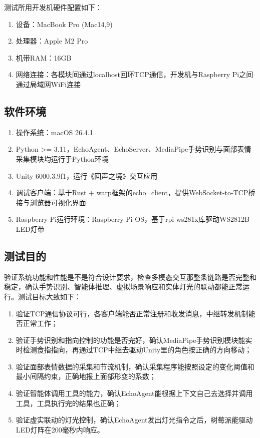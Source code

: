 \documentclass[bachelor]{njupthesis}
\begin{document}
测试所用开发机硬件配置如下：

\begin{enumerate}
\item 设备：MacBook Pro (Mac14,9)
\item 处理器：Apple M2 Pro
\item 机带RAM：16GB
\item 网络连接：各模块间通过localhost回环TCP通信，开发机与Raspberry Pi之间通过局域网WiFi连接
\end{enumerate}

\subsection{软件环境}

\begin{enumerate}
\item 操作系统：macOS 26.4.1
\item Python >= 3.11，EchoAgent、EchoServer、MediaPipe手势识别与面部表情采集模块均运行于Python环境
\item Unity 6000.3.9f1，运行《回声之境》交互应用
\item 调试客户端：基于Rust + warp框架的echo\_client，提供WebSocket-to-TCP桥接与浏览器可视化界面
\item Raspberry Pi运行环境：Raspberry Pi OS，基于rpi-ws281x库驱动WS2812B LED灯带
\end{enumerate}

\subsection{测试目的}

验证系统功能和性能是不是符合设计要求，检查多模态交互那整条链路是否完整和稳定，确认手势识别、智能体推理、虚拟场景响应和实体灯光的联动都能正常运行。测试目标大致如下：

\begin{enumerate}
\item 验证TCP通信协议可行，各客户端能否正常注册和收发消息，中继转发机制能否正常工作；
\item 验证手势识别和指向控制的功能是否完好，确认MediaPipe手势识别模块能实时检测食指指向，再通过TCP中继去驱动Unity里的角色按正确的方向移动；
\item 验证面部表情数据的采集和节流机制，确认采集程序能按照设定的变化阈值和最小间隔约束，正确地报上面部形变的系数；
\item 验证智能体调用工具的能力，确认EchoAgent能根据上下文自己去选择并调用工具，工具执行完的结果也正确；
\item 验证虚实联动的灯光控制，确认EchoAgent发出灯光指令之后，树莓派能驱动LED灯阵在200毫秒内响应。
\end{enumerate}
\end{document}
